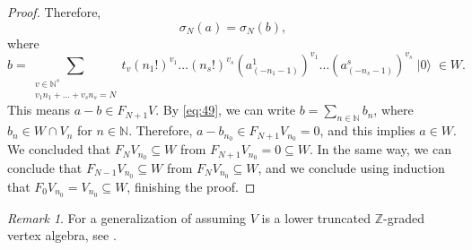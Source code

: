\documentclass[a4paper, 12pt, reqno]{amsart}
\theoremstyle{remark}
\newtheorem{remark}[theorem]{Remark}
\DeclareMathOperator{\vac}{|0\rangle}
\begin{document}
\begin{proof}
  Therefore,
  \begin{equation*}
    \sigma_N(a) = \sigma_N(b),
  \end{equation*}
  where
  \begin{equation*}
    b = \sum_{\substack{v \in \mathbb{N}^s \\ v_1n_1 + \dots + v_sn_s = N}}t_v(n_1!)^{v_1}\dots(n_s!)^{v_s}(a^1_{(-n_1 - 1)})^{v_1}\dots(a^s_{(-n_s - 1)})^{v_s}\vac \in W.
  \end{equation*}
  This means $a - b \in F_{N + 1}V$.
  By \eqref{eq:49}, we can write $b = \sum_{n \in \mathbb{N}}b_n$, where $b_n \in W \cap V_n$ for $n \in \mathbb{N}$.
  Therefore, $a - b_{n_0} \in F_{N + 1}V_{n_0} = 0$, and this implies $a \in W$.
  We concluded that $F_NV_{n_0} \subseteq W$ from $F_{N + 1}V_{n_0} = 0 \subseteq W$.
  In the same way, we can conclude that $F_{N - 1}V_{n_0} \subseteq W$ from $F_NV_{n_0} \subseteq W$, and we conclude using induction that $F_0V_{n_0} = V_{n_0} \subseteq W$, finishing the proof.
\end{proof}

\begin{remark}
  \label{rmk:46}
  For a generalization of  assuming $V$ is a lower truncated $\mathbb{Z}$-graded vertex algebra, see \cite[Theorem 4.8]{li_abelianizing_2005}.
\end{remark}
\end{document}
